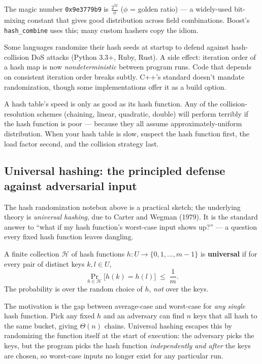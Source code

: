 \documentclass[11pt]{article}
\begin{document}
The magic number \texttt{0x9e3779b9} is $\frac{2^{32}}{\phi}$
($\phi$ = golden ratio) --- a widely-used bit-mixing constant
that gives good distribution across field combinations. Boost's
\texttt{hash\_combine} uses this; many custom hashers copy the
idiom.

\begin{notebox}
Some languages randomize their hash seeds at startup to defend
against hash-collision DoS attacks (Python 3.3+, Ruby, Rust). A
side effect: iteration order of a hash map is now
\emph{nondeterministic} between program runs. Code that depends
on consistent iteration order breaks subtly. C++'s standard
doesn't mandate randomization, though some implementations offer
it as a build option.
\end{notebox}

\begin{ideabox}
A hash table's speed is only as good as its hash function. Any
of the collision-resolution schemes (chaining, linear, quadratic,
double) will perform terribly if the hash function is poor ---
because they all assume approximately-uniform distribution. When
your hash table is slow, suspect the hash function first, the
load factor second, and the collision strategy last.
\end{ideabox}

\subsection*{Universal hashing: the principled defense against adversarial input}

The hash randomization notebox above is a practical sketch; the
underlying theory is \emph{universal hashing}, due to Carter and
Wegman (1979). It is the standard answer to ``what if my hash
function's worst-case input shows up?'' --- a question every fixed
hash function leaves dangling.

\begin{defnbox}
A finite collection $\mathcal{H}$ of hash functions
$h: U \to \{0, 1, \ldots, m-1\}$ is \textbf{universal} if for every
pair of distinct keys $k, l \in U$,
\[
\Pr_{h \in \mathcal{H}}\bigl[h(k) = h(l)\bigr] \;\leq\; \frac{1}{m}.
\]
The probability is over the random choice of $h$, \emph{not} over
the keys.
\end{defnbox}

The motivation is the gap between average-case and worst-case for
\emph{any single} hash function. Pick any fixed $h$ and an
adversary can find $n$ keys that all hash to the same bucket,
giving $\Theta(n)$ chains. Universal hashing escapes this by
randomizing the function itself at the start of execution: the
adversary picks the keys, but the program picks the hash function
\emph{independently and after} the keys are chosen, so worst-case
inputs no longer exist for any particular run.
\end{document}
